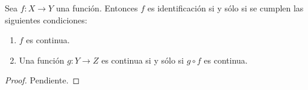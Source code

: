 

\begin{theorem}
Sea $f : X \longrightarrow Y$ una función. Entonces $f$ es identificación si y sólo si se cumplen las siguientes condiciones:
\begin{enumerate}[label=\textnormal{(\roman*)}]
\item $f$ es continua.
\item Una función $g : Y \longrightarrow Z$ es continua si y sólo si $g \circ f$ es continua.
\end{enumerate}
\bigskip

\end{theorem}

\begin{proof}
Pendiente.
\end{proof}
